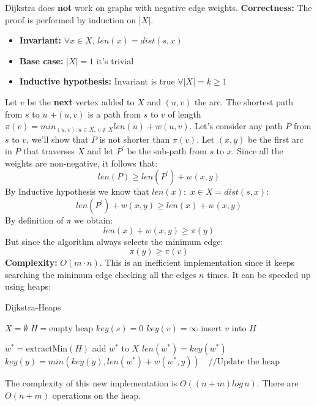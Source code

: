 Dijkstra does \textbf{not} work on graphs with negative edge weights.\newline\newline
\textbf{Correctness:}
The proof is performed by induction on $|X|$.
\begin{itemize}
    \item \textbf{Invariant:} $\forall x \in X$, $len(x) = dist(s, x)$

    \item \textbf{Base case:} $|X| = 1$ it's trivial

    \item \textbf{Inductive hypothesis:} Invariant is true $\forall |X| = k \geq 1$
\end{itemize}
Let $v$ be the \textbf{next} vertex added to $X$ and $(u, v)$ the arc. The shortest path from $s$ to $u$ $+ (u, v)$ is a path from $s$ to $v$ of length $\pi(v) = min_{(u, v): u \in X, \, v \notin X}len(u) + w(u, v)$. Let's consider any path $P$ from $s$ to $v$, we'll show that $P$ is not shorter than $\pi(v)$. Let $(x, y)$ be the first arc in $P$ that traverses $X$ and let $P^{'}$ be the sub-path from $s$ to $x$. Since all the weights are non-negative, it follows that:
\[len(P) \geq len(P^{'}) + w(x, y)\]
By Inductive hypothesis we know that $len(x): \,\, x \in X = dist(s, x)$:
\[len(P^{'}) + w(x, y) \geq len(x) + w(x, y)\]
By definition of $\pi$ we obtain:
\[len(x) + w(x, y) \geq \pi(y)\]
But since the algorithm always selects the minimum edge:
\[\pi(y) \geq \pi(v)\]
\textbf{Complexity:} $O(m \cdot n)$. This is an inefficient implementation since it keeps searching the minimum edge checking all the edges $n$ times. It can be speeded up using heaps:

\begin{algorithm}
\caption{Dijkstra-Heaps}\label{Dijkstra-Heaps}
    \begin{algorithmic}[1]
        \State $X = \emptyset$
        \State $H = \text{empty heap}$
        \State $key(s) = 0$
            \State $key(v) = \infty$
        \EndFor
            \State insert $v$ into $H$
        \EndFor

            \State $w^* = \text{extractMin}(H)$
            \State add $w^*$ to $X$
            \State $len(w^*) = key(w^*)$
                \State $key(y) = min(key(y), len(w^*) + w(w^*, y)) \quad //\text{Update the heap}$
            \EndFor
        \EndWhile
    \EndProcedure
    \end{algorithmic}
\end{algorithm}
The complexity of this new implementation is $O((n + m) log\,n)$. There are $O(n + m)$ operations on the heap.

